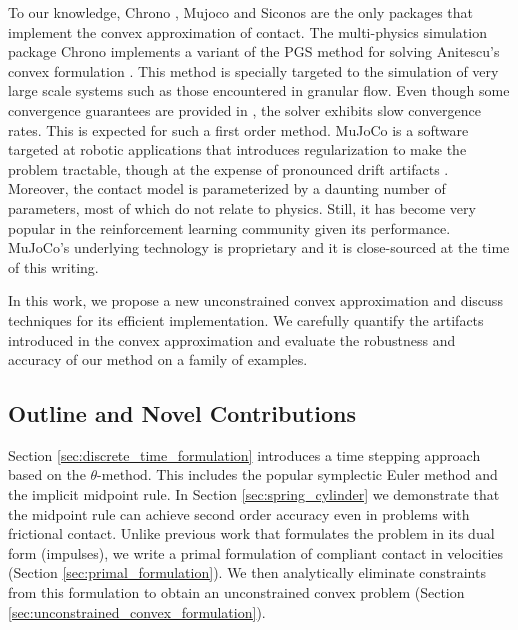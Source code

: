 To our knowledge, Chrono \cite{bib:chrono2016}, Mujoco \cite{bib:mujoco} and
Siconos \cite{bib:acary2019siconos} are the only packages that implement the
convex approximation of contact. The multi-physics simulation package Chrono
implements a variant of the PGS method for solving Anitescu's convex formulation
\cite{bib:tasora2011}. This method is specially targeted to the simulation of
very large scale systems such as those encountered in granular flow. Even though
some convergence guarantees are provided in \cite{bib:anitescu2010}, the solver
exhibits slow convergence rates. This is expected for such a first order method.
MuJoCo is a software targeted at robotic applications that introduces
regularization to make the problem tractable, though at the expense of
pronounced drift artifacts \cite{bib:simbenchmark}. Moreover, the contact model
is parameterized by a daunting number of parameters, most of which do not relate
to physics. Still, it has become very popular in the reinforcement learning
community given its performance. MuJoCo's underlying technology is proprietary
and it is close-sourced at the time of this writing.

 In this work, we propose a new
unconstrained convex approximation and discuss techniques for its efficient
implementation. We carefully quantify the artifacts introduced in the convex
approximation and evaluate the robustness and accuracy of our method on a family
of examples.

\subsection{Outline and Novel Contributions}
Section \ref{sec:discrete_time_formulation} introduces a time stepping approach
based on the $\theta\text{-method}$. This includes the popular symplectic Euler
method and the implicit midpoint rule. In Section \ref{sec:spring_cylinder} we
demonstrate that the midpoint rule can achieve second order accuracy even in
problems with frictional contact. Unlike previous work
\cite{bib:anitescu2010,bib:todorov2014} that formulates the problem in its dual
form (impulses), we write a primal formulation of compliant contact in
velocities (Section \ref{sec:primal_formulation}). We then analytically
eliminate constraints from this formulation to obtain an unconstrained convex
problem (Section \ref{sec:unconstrained_convex_formulation}).

